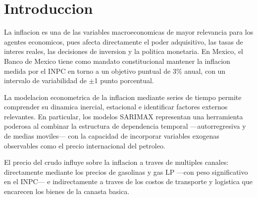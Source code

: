 \documentclass[12pt,a4paper]{article}
\begin{document}
\begin{abstract}
\noindent
Este trabajo analiza la variacion anual del Indice Nacional de Precios al Consumidor (INPC) de Mexico para el periodo enero 2005 -- diciembre 2023, mediante la estimacion de un modelo SARIMAX$(1,1,2)(1,1,1)_{12}$. El precio del petroleo West Texas Intermediate (WTI) se incorpora como variable exogena dado su papel como determinante de los precios energeticos que impactan directamente la canasta inflacionaria. El modelo captura adecuadamente los episodios de alta volatilidad inflacionaria asociados a la crisis financiera de 2008, el gasolinazo de 2017 y el repunte inflacionario global de 2022. Los criterios AIC y BIC seleccionan el modelo especificado, cuyos residuales son consistentes con ruido blanco. El pronostico para 2023 presenta un RMSE de 1.55 puntos porcentuales.

\medskip
\noindent\textbf{Palabras clave:} SARIMAX, INPC, inflacion, precio del petroleo, series de tiempo, Mexico.
\end{abstract}

\tableofcontents
\newpage

\section{Introduccion}

La inflacion es una de las variables macroeconomicas de mayor relevancia para los agentes economicos, pues afecta directamente el poder adquisitivo, las tasas de interes reales, las decisiones de inversion y la politica monetaria. En Mexico, el Banco de Mexico tiene como mandato constitucional mantener la inflacion medida por el INPC en torno a un objetivo puntual de 3\% anual, con un intervalo de variabilidad de $\pm$1 punto porcentual.

La modelacion econometrica de la inflacion mediante series de tiempo permite comprender su dinamica inercial, estacional e identificar factores externos relevantes. En particular, los modelos SARIMAX representan una herramienta poderosa al combinar la estructura de dependencia temporal ---autorregresiva y de medias moviles--- con la capacidad de incorporar variables exogenas observables como el precio internacional del petroleo.

El precio del crudo influye sobre la inflacion a traves de multiples canales: directamente mediante los precios de gasolinas y gas LP ---con peso significativo en el INPC--- e indirectamente a traves de los costos de transporte y logistica que encarecen los bienes de la canasta basica.
\end{document}
